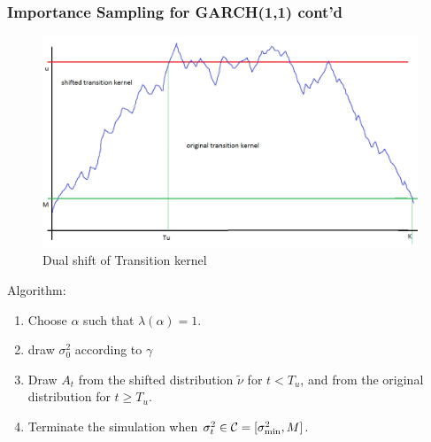 \documentclass{beamer}
\begin{document}
\begin{frame}
  \frametitle{Importance Sampling for GARCH(1,1) cont'd}
  \begin{minipage}[t]{0.5\linewidth}
    \begin{figure}
      \centering
      \includegraphics[width=1.0\linewidth]{pic1.png}
      \caption{\footnotesize Dual shift of Transition kernel}
      \label{fig:dual_measure}
    \end{figure}
  \end{minipage}\hfill
  \begin{minipage}[t]{0.45\linewidth}
    \begin{small}
      Algorithm:
      \begin{enumerate}
      \item Choose $\alpha$ such that $\lambda(\alpha) = 1$.
      \item draw $\sigma_0^2$ according to $\gamma$
      \item Draw $A_t$ from the shifted distribution $\tilde \nu$ for $t < T_u$, and from
        the original distribution for $t \geq T_u$.
      \item Terminate the simulation when $\sigma_t^2 \in \mathcal C = [\sigma_{\text{min}}^2, M]$.
      \end{enumerate}
    \end{small}
  \end{minipage}
\end{frame}
\end{document}
